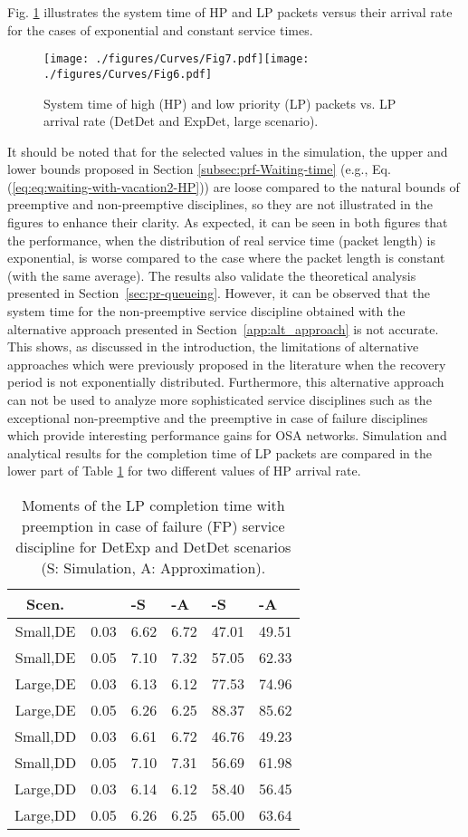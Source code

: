 \documentclass[11pt,journal,oneside,onecolumn,draftclsnofoot]{IEEEtran}
\begin{document}
Fig. \ref{30212-D2-ED-Large} illustrates the system time of HP and LP packets versus their arrival rate for the cases of exponential and constant service times. 
\begin{figure}\texttt{[image: ./figures/Curves/Fig7.pdf]}\texttt{[image: ./figures/Curves/Fig6.pdf]}\caption{System time of high (HP) and low priority (LP) packets vs. LP arrival rate (DetDet and ExpDet, large scenario).}\label{30212-D2-ED-Large}\end{figure}
It should be noted that for the selected values in the simulation, the upper and lower bounds proposed in Section \ref{subsec:prf-Waiting-time} (e.g., Eq. (\ref{eq:eq:waiting-with-vacation2-HP})) are loose compared to the natural bounds of preemptive and non-preemptive disciplines, so they are not illustrated in the figures to enhance their clarity.
As expected, it can be seen in both figures that the performance, when the distribution of real service time (packet length) is exponential, is worse compared to the case where the packet length is constant (with the same average). The results also validate the theoretical analysis presented in Section~\ref{sec:pr-queueing}. However, it can be observed that the system time for the non-preemptive service discipline obtained with the alternative approach presented in Section~\ref{app:alt_approach} is not accurate. This shows, as discussed in the introduction, the limitations of alternative approaches which were previously proposed in the literature when the recovery period is not exponentially distributed. Furthermore, this alternative approach can not be used to analyze more sophisticated service disciplines such as the exceptional non-preemptive and the preemptive in case of failure disciplines which provide interesting performance gains for OSA networks.
Simulation and analytical results for the completion time of LP packets are compared in the lower part of Table \ref{tab:X2moments-NewPr} for two different values of HP arrival rate. 
\begin{table}[]
\renewcommand{\arraystretch}{1.3}
 \scriptsize
\caption{{Moments of the LP completion time with preemption in case of failure (FP) service discipline for DetExp and DetDet scenarios (S: Simulation, A: Approximation). }}\label{tab:X2moments-NewPr}
\begin{tabular} {|c|c|l|l|l|l|}
 \hline
 {\textbf{Scen.}}&{\textbf {}}&{\textbf {-S}} &{\textbf {-A}}&{\textbf {-S}}&{\textbf {-A}} \\
 \hline
Small,DE&0.03&6.62&6.72&47.01&49.51\\
 \hline
Small,DE&0.05&7.10&7.32&57.05&62.33\\
 \hline
Large,DE&0.03&6.13&6.12&77.53&74.96\\
 \hline
Large,DE&0.05&6.26&6.25&88.37&85.62\\
\hline
\hline
Small,DD&0.03&6.61&6.72&46.76&49.23\\
 \hline
Small,DD&0.05&7.10&7.31&56.69&61.98\\
 \hline
Large,DD&0.03&6.14&6.12&58.40&56.45\\
 \hline
Large,DD&0.05&6.26&6.25&65.00&63.64\\
\hline
\end{tabular}
\normalsize
\end{table}
\end{document}
